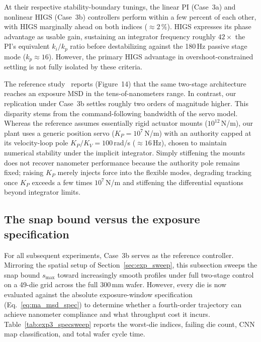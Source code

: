 At their respective stability-boundary tunings, the linear PI (Case~3a) and nonlinear HIGS (Case~3b) controllers perform within a few percent of each other, with HIGS marginally ahead on both indices ($\approx 2\,\%$). HIGS expresses its phase advantage as usable gain, sustaining an integrator frequency roughly $42\times$ the PI's equivalent $k_i/k_p$ ratio before destabilizing against the 180\,Hz passive stage mode ($k_p \approx 16$). However, the primary HIGS advantage in overshoot-constrained settling is not fully isolated by these criteria.

The reference study~\cite{Al-Rawashdeh2022_Caracterization} reports (Figure~14) that the same two-stage architecture reaches an exposure MSD in the tens-of-nanometers range. In contrast, our replication under Case~3b settles roughly two orders of magnitude higher. This disparity stems from the command-following bandwidth of the servo model. Whereas the reference assumes essentially rigid actuator mounts ($10^{12}$\,N/m), our plant uses a generic position servo ($K_P = 10^7$\,N/m) with an authority capped at its velocity-loop pole $K_P/K_V = 100$\,rad/s ($\approx 16$\,Hz), chosen to maintain numerical stability under the implicit integrator. Simply stiffening the mounts does not recover nanometer performance because the authority pole remains fixed; raising $K_P$ merely injects force into the flexible modes, degrading tracking once $K_P$ exceeds a few times $10^7$\,N/m and stiffening the differential equations beyond integrator limits.

\subsection{The snap bound versus the exposure specification}\label{sec:exp_specsweep}

For all subsequent experiments, Case~3b serves as the reference controller. Mirroring the spatial setup of Section~\ref{sec:exp_sweep}, this subsection sweeps the snap bound $s_{\max}$ toward increasingly smooth profiles under full two-stage control on a 49-die grid across the full $300\,\mathrm{mm}$ wafer. However, every die is now evaluated against the absolute exposure-window specification (Eq.~\eqref{eq:ma_msd_spec}) to determine whether a fourth-order trajectory can achieve nanometer compliance and what throughput cost it incurs. Table~\ref{tab:exp3_specsweep} reports the worst-die indices, failing die count, CNN map classification, and total wafer cycle time.

